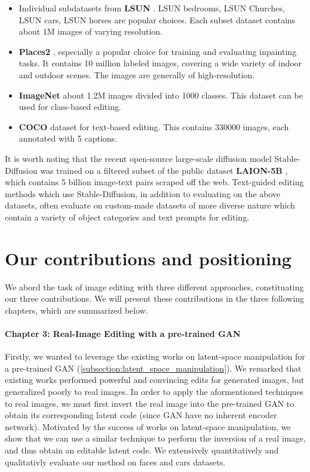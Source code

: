 \begin{itemize}
      \item Individual subdatasets from \textbf{LSUN} \citep{lsun}. LSUN bedrooms, LSUN Churches, LSUN cars, LSUN horses are popular choices. Each subset dataset contains about 1M images of varying resolution. 
      \item \textbf{Places2} \citep{zhou2017places}, especially a popular choice for training and evaluating inpainting tasks. It contains 10 million labeled images, covering a wide variety of indoor and outdoor scenes. The images are generally of high-resolution.
      \item \textbf{ImageNet} \citep{russakovsky2015imagenet_ilsvrc} about 1.2M images divided into 1000 classes. This dataset can be used for class-based editing.
      \item \textbf{COCO} dataset \citep{caesar2018cocoostuff} for text-based editing. This contains 330000 images, each annotated with 5 captions. 
\end{itemize}

It is worth noting that the recent open-source large-scale diffusion model Stable-Diffusion was trained 
on a filtered subset of the public dataset \textbf{LAION-5B} \citep{schuhmann2022laion}, which contains
5 billion image-text pairs scraped off the web. Text-guided editing methods which use Stable-Diffusion, 
in addition to evaluating on the above datasets, often evaluate on custom-made datasets \citep{bar2022text2live, mokady2023null} of more diverse nature which contain a variety of object categories and 
text prompts for editing.


\section{Our contributions and positioning}

We abord the task of image editing with three different approaches, constituating our three 
contributions. We will present these contributions in the three following chapters, which 
are summarized below.

\paragraph{Chapter 3: Real-Image Editing with a pre-trained \ac{GAN}}

Firstly, we wanted to leverage the existing works on latent-space manipulation for a pre-trained \ac{GAN} 
(\ref{subsection:latent_space_manipulation}). We remarked that existing works performed powerful and 
convincing edits for generated images, but generalized poorly to real images. In order to apply the 
aformentioned techniques to real images, we must first invert the real image into the pre-trained \ac{GAN}
to obtain its corresponding latent code (since \ac{GAN} have no inherent encoder network). Motivated by 
the success of works on latent-space manipulation, we show that we can use a similar technique to 
perform the inversion of a real image, and thus obtain an editable latent code. We extensively 
quantitatively and qualitativly evaluate our method on faces and cars datasets.

